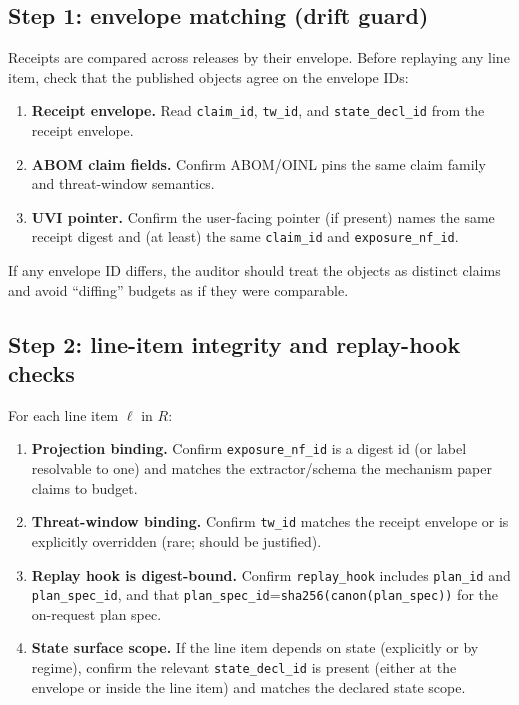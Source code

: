 \documentclass[11pt]{article}
\begin{document}
\subsection{Step 1: envelope matching (drift guard)}
Receipts are compared across releases by their envelope.
Before replaying any line item, check that the published objects agree on the envelope IDs:
\begin{enumerate}[leftmargin=*]
\item \textbf{Receipt envelope.} Read \texttt{claim\_id}, \texttt{tw\_id}, and \texttt{state\_decl\_id} from the receipt envelope.\cite{series:receiptitems}
\item \textbf{ABOM claim fields.} Confirm ABOM/OINL pins the same claim family and threat-window semantics.
\item \textbf{UVI pointer.} Confirm the user-facing pointer (if present) names the same receipt digest and (at least) the same \texttt{claim\_id} and \texttt{exposure\_nf\_id}.\cite{series:transparencyprimitives}
\end{enumerate}
If any envelope ID differs, the auditor should treat the objects as distinct claims and avoid ``diffing'' budgets as if they were comparable.\cite{series:planstateequiv}

\subsection{Step 2: line-item integrity and replay-hook checks}
For each line item $\ell$ in $R$:
\begin{enumerate}[leftmargin=*]
\item \textbf{Projection binding.} Confirm \texttt{exposure\_nf\_id} is a digest id (or label resolvable to one) and matches the extractor/schema the mechanism paper claims to budget.\cite{series:receiptitems}
\item \textbf{Threat-window binding.} Confirm \texttt{tw\_id} matches the receipt envelope or is explicitly overridden (rare; should be justified).\cite{series:receiptitems}
\item \textbf{Replay hook is digest-bound.} Confirm \texttt{replay\_hook} includes \texttt{plan\_id} and \texttt{plan\_spec\_id}, and that \texttt{plan\_spec\_id}=\texttt{sha256(canon(plan\_spec))} for the on-request plan spec.\cite{series:planstateequiv}
\item \textbf{State surface scope.} If the line item depends on state (explicitly or by regime), confirm the relevant \texttt{state\_decl\_id} is present (either at the envelope or inside the line item) and matches the declared state scope.\cite{series:accountingrulebook}
\end{enumerate}
\end{document}
